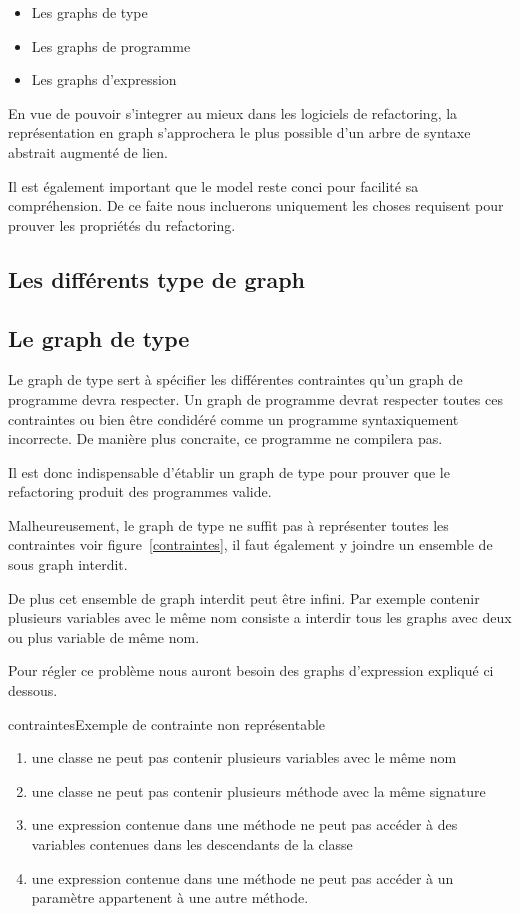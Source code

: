 \documentclass[a4paper, 12pt]{article}
\begin{document}
\begin{itemize}
\item Les graphs de type
\item Les graphs de programme
\item Les graphs d'expression
\end{itemize}

En vue de pouvoir s'integrer au mieux dans les logiciels de refactoring, la représentation en graph s'approchera le plus possible d'un arbre de syntaxe abstrait augmenté de lien.

Il est également important que le model reste conci pour facilité sa compréhension. De ce faite nous incluerons uniquement les choses requisent pour prouver les propriétés du refactoring.

\subsection{Les différents type de graph}

\subsection{Le graph de type}

Le graph de type sert à spécifier les différentes contraintes qu'un graph de programme devra respecter. Un graph de programme devrat respecter toutes ces contraintes ou bien être condidéré comme un programme syntaxiquement incorrecte. De manière plus concraite, ce programme ne compilera pas.

Il est donc indispensable d'établir un graph de type pour prouver que le refactoring produit des programmes valide.

Malheureusement, le graph de type ne suffit pas à représenter toutes les contraintes voir figure~\ref{contraintes}, il faut également y joindre un ensemble de sous graph interdit.

De plus cet ensemble de graph interdit peut être infini. Par exemple contenir plusieurs variables avec le même nom consiste a interdir tous les graphs avec deux ou plus variable de même nom.

Pour régler ce problème nous auront besoin des graphs d'expression expliqué ci dessous.\label{subsec:graphExpression}


\begin{myfig}{contraintes}{Exemple de contrainte non représentable}
\begin{enumerate}
 \scriptsize \item une classe ne peut pas contenir plusieurs variables avec le même nom
 \scriptsize \item une classe ne peut pas contenir plusieurs méthode avec la même signature
 \scriptsize \item une expression contenue dans une méthode ne peut pas accéder à des variables contenues dans les descendants de la classe
 \scriptsize \item une expression contenue dans une méthode ne peut pas accéder à un paramètre appartenent à une autre méthode.
\end{enumerate}
\end{myfig}
\end{document}
